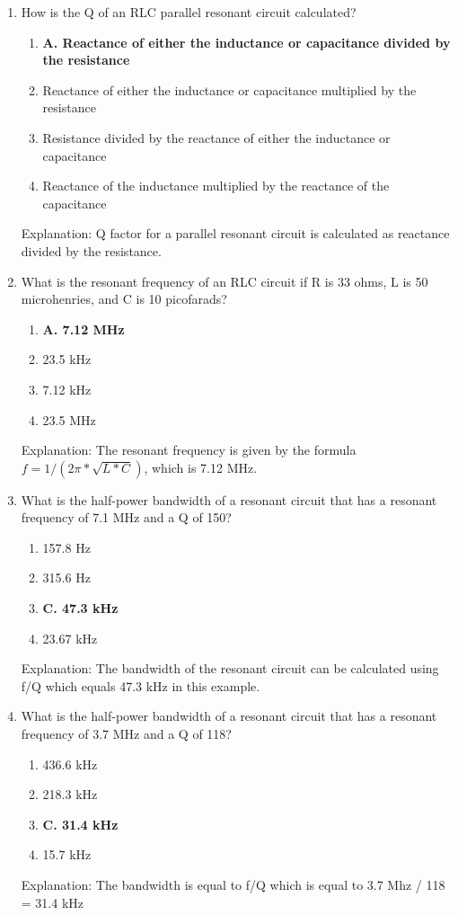\begin{enumerate}
    \item How is the Q of an RLC parallel resonant circuit calculated?
      \begin{enumerate}
        \item \textbf{A. Reactance of either the inductance or capacitance divided by the resistance}
        \item  Reactance of either the inductance or capacitance multiplied by the resistance
       \item  Resistance divided by the reactance of either the inductance or capacitance
       \item  Reactance of the inductance multiplied by the reactance of the capacitance
        \end{enumerate}
       \textcolor{myred}{Explanation:}
        Q factor for a parallel resonant circuit is calculated as reactance divided by the resistance.

     \item What is the resonant frequency of an RLC circuit if R is 33 ohms, L is 50 microhenries, and C is 10 picofarads?
       \begin{enumerate}
        \item \textbf{A. 7.12 MHz}
       \item  23.5 kHz
        \item  7.12 kHz
         \item  23.5 MHz
       \end{enumerate}
       \textcolor{myred}{Explanation:}
   The resonant frequency is given by the formula $f = 1 / (2\pi * \sqrt{L*C})$, which is 7.12 MHz.

    \item What is the half-power bandwidth of a resonant circuit that has a resonant frequency of 7.1 MHz and a Q of 150?
    \begin{enumerate}
         \item  157.8 Hz
       \item  315.6 Hz
        \item \textbf{C. 47.3 kHz}
       \item  23.67 kHz
      \end{enumerate}
         \textcolor{myred}{Explanation:}
        The bandwidth of the resonant circuit can be calculated using f/Q which equals 47.3 kHz in this example.
    
     \item What is the half-power bandwidth of a resonant circuit that has a resonant frequency of 3.7 MHz and a Q of 118?
       \begin{enumerate}
     \item  436.6 kHz
     \item  218.3 kHz
     \item \textbf{C. 31.4 kHz}
         \item  15.7 kHz
       \end{enumerate}
    \textcolor{myred}{Explanation:}
       The bandwidth is equal to f/Q which is equal to 3.7 Mhz / 118 = 31.4 kHz


\end{enumerate}
